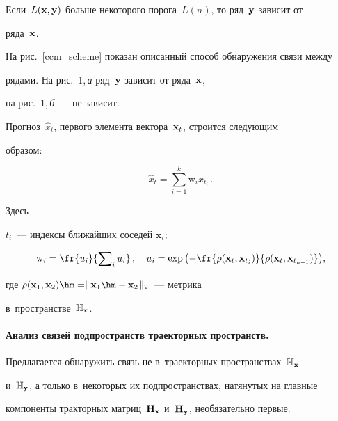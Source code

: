 Если~$L(\mathbf{x}, \mathbf{y})$ больше некоторого порога~$L(n)$, то ряд~$\mathbf{y}$ зависит от 

ряда~$\mathbf{x}$.



На рис.~\ref{ccm_scheme} показан описанный способ обнаружения связи между 

рядами. На рис.~1,\,\textit{а} ряд~$\mathbf{y}$ зависит от ряда~$\mathbf{x}$, 

на рис.~1,\,\textit{б}~--- не  зависит.







Прогноз~$\hat{x}_t$, первого элемента вектора~$\mathbf{x}_t$, строится следующим 

образом:

\begin{equation*}


\hat{x}_t = \displaystyle\sum\limits_{i = 1}^{k} \mathrm{w}_i x_{t_i}\,.

\end{equation*}

Здесь

$t_i$~--- индексы ближайших соседей $\mathbf{x}_{t}$;

\begin{equation*}

\mathrm{w}_i = \fr{u_i}{\sum\nolimits_{i}u_i}\,, \quad u_i = \exp{\left(-

\fr{\rho(\mathbf{x}_t, \mathbf{x}_{t_i})}{\rho(\mathbf{x}_t, \mathbf{x}_{t_{n 

+ 1}})}\right)},

\end{equation*}

где $\rho(\bx_1, \bx_2) \hm= \parallel\! \bx_1 \hm- \bx_2\!\parallel_2$~--- метрика 

в~пространстве~$\mathbb{H}_{\mathbf{x}}$.





\paragraph*{Анализ связей подпространств траекторных пространств.}

Предлагается обнаружить связь не в~траекторных пространствах~$\mathbb{H}_{\mathbf{x}}$ 

и~$\mathbb{H}_{\mathbf{y}}$, а только в~некоторых их подпространствах, натянутых на главные 

компоненты тракторных матриц~$\mathbf{H}_{\mathbf{x}}$ и~$\mathbf{H}_{\mathbf{y}}$, необязательно первые.

